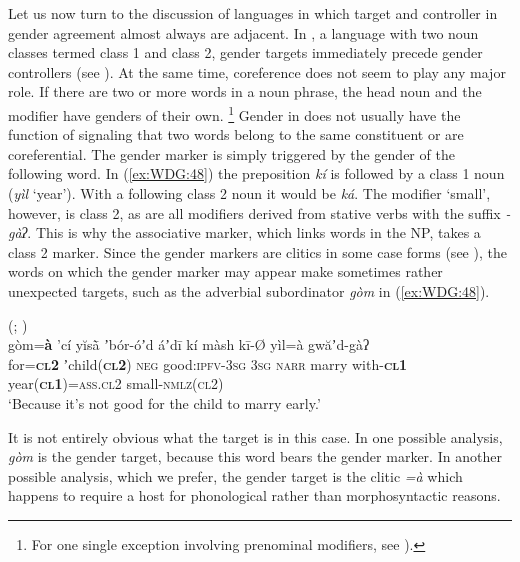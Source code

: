 \documentclass[output=collectionpaper]{langsci/langscibook}
\begin{document}
Let us now turn to the discussion of languages in which target and controller in gender agreement almost always are adjacent. In , a language with two noun classes termed class 1 and class 2, gender targets immediately precede gender controllers (see ). At the same time, coreference does not seem to play any major role. If there are two or more words in a noun phrase, the head noun and the modifier have genders of their own.%
\footnote{%
For one single exception involving prenominal modifiers, see \cite[128]{Killian2015}).
} %
Gender in  does not usually have the function of signaling that two words belong to the same constituent or are coreferential. The gender marker is simply triggered by the gender of the following word. In (\ref{ex:WDG:48}) the preposition \textit{kí} is followed by a class 1 noun (\textit{yìl} `year'). With a following class 2 noun it would be \textit{ká}. The modifier `small', however, is class 2, as are all modifiers derived from stative verbs with the suffix \textit{-gàʔ}. This is why the associative marker, which links words in the NP, takes a class 2 marker. Since the gender markers are clitics in some case forms (see ), the words on which the gender marker may appear make sometimes rather unexpected targets, such as the adverbial subordinator \textit{gòm} in (\ref{ex:WDG:48}).

\ea\label{ex:WDG:48}
 (; \citealt[382]{Killian2015})\\
\gll gòm=\textbf{à}	'cí	yĭsā̀	ʼbór-óʼd	áʼdī	kí	màsh	kī-Ø	yìl=à	gwăʼd-gàʔ\\
 for=\textbf{\textsc{cl2}}	ʼchild(\textbf{\textsc{cl2}})	\textsc{neg}	good:\textsc{ipfv-3sg}	\textsc{3sg}	\textsc{narr}	marry	with-\textbf{\textsc{cl1}}	year(\textbf{\textsc{cl1}})=\textsc{ass.cl2}	small-\textsc{nmlz(cl2)}\\
\glt `Because it's not good for the child to marry early.' \\
\z

\noindent It is not entirely obvious what the target is in this case. In one possible analysis, \textit{gòm} is the gender target, because this word bears the gender marker. In another possible analysis, which we prefer, the gender target is the clitic \textit{=à} which happens to require a host for phonological rather than morphosyntactic reasons.
\end{document}
